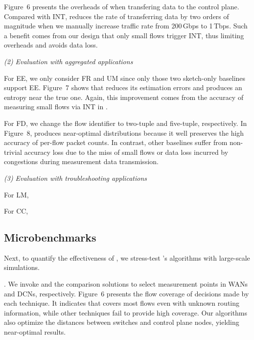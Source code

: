 
Figure~6 presents the overheads of \sysname when transfering data to the control plane. Compared with INT, \sysname reduces the rate of transferring data by two orders of magnitude when we manually increase traffic rate from 200\,Gbps to 1\,Tbps. Such a benefit comes from our design that only small flows trigger INT, thus limiting overheads and avoids data loss. 


\noindent \emph{(2) Evaluation with aggregated applications}

For EE, we only consider FR and UM since only those two sketch-only baselines support EE. Figure~7 shows that \sysname reduces its estimation errors and produces an entropy near the true one. Again, this improvement comes from the accuracy of measuring small flows via INT in \sysname. 

For FD, we change the flow identifier to two-tuple and five-tuple, respectively. In Figure~8, \sysname produces near-optimal distributions because it well preserves the high accuracy of per-flow packet counts. In contrast, other baselines suffer from non-trivial accuracy loss due to the miss of small flows or data loss incurred by congestions during measurement data transmission. 

\noindent \emph{(3) Evaluation with troubleshooting applications}

For LM, 

For CC, 

\subsection{Microbenchmarks}

Next, to quantify the effectiveness of \sysname, we stress-test \sysname's algorithms with large-scale simulations. 

. We invoke \sysname and the comparison solutions to select measurement points in WANs and DCNs, respectively. Figure~6 presents the flow coverage of decisions made by each technique. It indicates that \sysname covers most flows even with unknown routing information, while other techniques fail to provide high coverage. Our algorithms also optimize the distances between switches and control plane nodes, yielding near-optimal results. 

